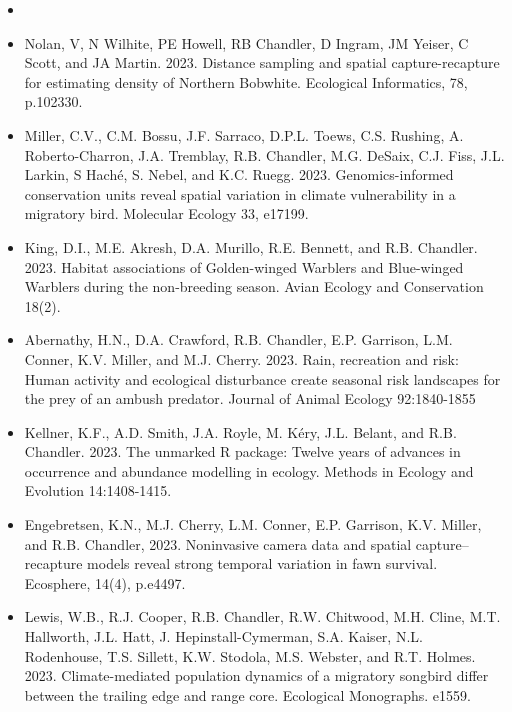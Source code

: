 \documentclass[12pt]{article}
\begin{document}
\begin{itemize}

\item[] { \\}

\item Nolan, V, N Wilhite, PE Howell, RB Chandler, D Ingram,
  JM Yeiser, C Scott, and JA Martin. 2023. Distance
  sampling and spatial capture-recapture for estimating density of
  Northern Bobwhite. Ecological Informatics, 78, p.102330. 

\item Miller, C.V., C.M. Bossu, J.F. Sarraco, D.P.L. Toews,
  C.S. Rushing, A. Roberto-Charron, J.A. Tremblay, R.B. Chandler,
  M.G. DeSaix, C.J. Fiss, J.L. Larkin, S Hach\'{e}, S. Nebel, and
  K.C. Ruegg. 2023. Genomics-informed conservation units reveal
  spatial variation in climate vulnerability in a migratory
  bird. Molecular Ecology 33, e17199.

\item King, D.I., M.E. Akresh, D.A. Murillo, R.E. Bennett, and R.B.
  Chandler. 2023. Habitat associations of Golden-winged Warblers and
  Blue-winged Warblers during the non-breeding season. Avian Ecology
  and Conservation 18(2).  

\item Abernathy, H.N., D.A. Crawford, R.B. Chandler, E.P. Garrison,
  L.M. Conner, K.V. Miller, and M.J. Cherry. 2023. Rain, recreation
  and risk: Human activity and ecological disturbance create seasonal
  risk landscapes for the prey of an ambush predator. Journal of
  Animal Ecology 92:1840-1855
  
\item Kellner, K.F., A.D. Smith, J.A. Royle, M. K\'ery, J.L. Belant,
  and R.B. Chandler. 2023. The unmarked R package: Twelve years of
  advances in occurrence and abundance modelling in ecology. Methods
  in Ecology and Evolution 14:1408-1415. 
  
\item Engebretsen, K.N., M.J. Cherry, L.M. Conner, E.P. Garrison,
  K.V. Miller, and R.B. Chandler, 2023. Noninvasive camera data and
  spatial capture–recapture models reveal strong temporal variation in
  fawn survival. Ecosphere, 14(4), p.e4497. 

\item Lewis, W.B., R.J. Cooper, R.B. Chandler, R.W. Chitwood,
  M.H. Cline, M.T. Hallworth, J.L. Hatt, J. Hepinstall-Cymerman,
  S.A. Kaiser, N.L. Rodenhouse, T.S. Sillett, K.W. Stodola,
  M.S. Webster, and R.T. Holmes. 2023. Climate-mediated population
  dynamics of a migratory songbird differ between the trailing edge
  and range core. Ecological Monographs. e1559. 


\end{itemize}
\end{document}
